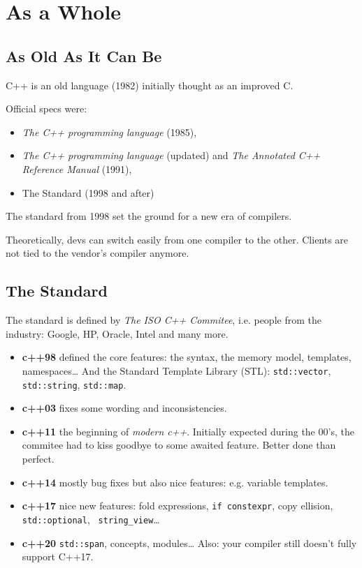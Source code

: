 \chapter{\cpp As a Whole}

\section{As Old As It Can Be}

C++ is an old language (1982) initially thought as an improved C.

Official specs were:
\begin{itemize}
\item {\it The C++ programming language} (1985),
\item {\it The C++ programming language} (updated) and {\it The
  Annotated C++ Reference Manual} (1991),
\item The Standard (1998 and after)
\end{itemize}

The standard from 1998 set the ground for a new era of compilers.

Theoretically, devs can switch easily from one compiler to the
other. Clients are not tied to the vendor's compiler anymore.

\section{The Standard}

The standard is defined by {\em The ISO C++ Commitee}, i.e. people from the
industry: Google, HP, Oracle, Intel and many more.

\begin{itemize}
\item {\bf c++98} defined the core features: the syntax, the memory
  model, templates, namespaces… And the Standard Template Library
  (STL): {\tt std::vector}, {\tt std::string}, {\tt std::map}.
\item {\bf c++03} fixes some wording and inconsistencies.
\item {\bf c++11} the beginning of {\em modern c++}. Initially
  expected during the 00's, the commitee had to kiss goodbye to some
  awaited feature. Better done than perfect.
\item {\bf c++14} mostly bug fixes but also nice features:
  e.g. variable templates.
\item {\bf c++17} nice new features: fold expressions, {\tt if
  constexpr}, copy ellision, {\tt std::optional}, {\tt
  string\_view}…
\item {\bf c++20} {\tt std::span}, concepts, modules… Also: your
  compiler still doesn't fully support C++17.
\end{itemize}


